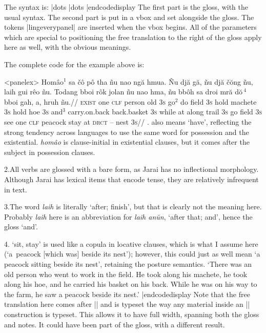 The syntax is:
\codedisplay
\beginglpanel |dots \endgl |dots \endpanel
|endcodedisplay
The first part is the gloss, with the usual syntax.  The second
part is put in a vbox and set alongside the gloss. The tokens
|lingeverypanel| are inserted when the vbox begins. All of the
parameters which are special to positioning the free translation
to the right of the gloss apply here as well, with the obvious
meanings.

The complete code for the example above is:

\codedisplay
\ex[everypanel=\footnotesize]<panelex>
\let\\=\textsc
\beginglpanel[ssratio=.5,glhangstyle=none]
\gla Hom\^{a}o$^1$ sa \v{c}\^{o} p\^{o} tha  \~{n}u nao ng\u{a}
hmua. \~{N}u dj\u{a} g\u{a}, \~{n}u dj\u{a} \v{c}\u{o}ng \~{n}u,
laih gui r\^{e}o \~{n}u. Todang bboi r\^{o}k jolan \~{n}u nao
hma, \~{n}u bb\^{o}h sa droi mr\u{a} d\u{o}$\,^4$ bboi gah, a, hruh
\~{n}u.//
\glb \\{exist} one \\{clf} person old \\{3s} go$^2$ do field
\\{3s} hold machete \\{3s} hold hoe \\{3s} and$^3$ carry.on.back
back.basket \\{3s} while at along trail \\{3s} go field \\{3s}
see one \\{clf} peacock stay at \\{drct} -- nest \\{3s}//
. also means `have', reflecting the
strong tendency across languages to use the same word for
possession and the existential. {\it hom\^{a}o} is clause-initial
in existential clauses, but it comes after the subject in
possession clauses.

2.\enspace All verbs are glossed with a bare form, as Jarai has
no inflectional morphology. Although Jarai has lexical items that
encode tense, they are relatively infrequent in text.

3.\enspace The word {\it laih} is literally `after; finish', but
that is clearly not the meaning here. Probably {\it laih} here is
an abbreviation for {\it laih an\u{u}n}, `after that; and', hence
the gloss `and'.

4. `sit, stay' is used like a copula in
locative clauses, which is what I assume here (`a~peacock [which
was] beside its nest'); however, this could just as well mean `a
peacock sitting beside its nest', retaining the posture
semantics.
\endpanel
\bigskip
`There was an old person who went to work in the field. He took
along his machete, he took along his hoe, and he carried his
basket on his back. While he was on his way to the farm, he saw a
peacock beside its nest.'
\xe
|endcodedisplay
Note that the free translation here comes after |\endpanel| and is
typeset the way any material inside an |\ex| construction is
typeset.  This allows it to have full width, spanning both the
gloss and notes.  It could have been part of the gloss, with a
different result.

